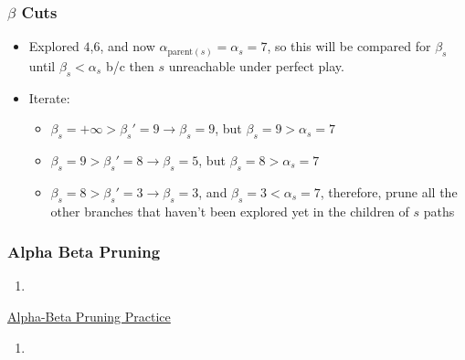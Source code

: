 \subsubsection{$\beta$ Cuts}
\begin{example}
    \begin{itemize}
        \item Explored $4$,$6$, and now $\alpha_{\text{parent}(s)} = \alpha_s = 7$, so this will be compared for $\beta_s$ until $\beta_s < \alpha_s$ b/c then $s$ unreachable under perfect play.
        \item Iterate:
        \begin{itemize}
            \item $\beta_s = +\infty > \beta_s' = 9 \rightarrow \beta_s = 9$, but $\beta_s = 9 > \alpha_s = 7$
            \item $\beta_s = 9 > \beta_s' = 8 \rightarrow \beta_s = 5$, but $\beta_s = 8 > \alpha_s = 7$
            \item $\beta_s = 8 > \beta_s' = 3 \rightarrow \beta_s = 3$, and $\beta_s = 3 < \alpha_s = 7$, therefore, prune all the other branches that haven't been explored yet in the children of $s$ paths
        \end{itemize}
    \end{itemize}
\end{example}
\newpage

\subsubsection{Alpha Beta Pruning}
\begin{process}
    \begin{enumerate}
        \item 
    \end{enumerate}
\end{process}

\begin{example} \href{https://pascscha.ch/info2/abTreePractice/}{Alpha-Beta Pruning Practice}
    \begin{enumerate}
        \item 
    \end{enumerate}
\end{example}